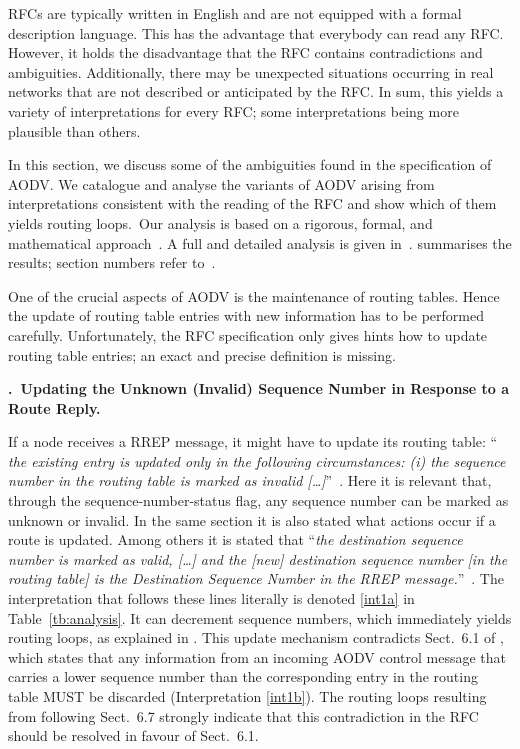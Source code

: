 \documentclass[letterpaper]{sig-alternate-pages}
\newcommand{\rtes}{routing table entries\xspace}
\renewcommand{\sf}{\it}
\begin{document}
\hspace{-1.28546pt}RFCs are typically written in English and are not equipped with a formal description language. 
This has the advantage that everybody can read any RFC\@. 
However, it holds the disadvantage that the RFC contains contradictions and ambiguities. 
Additionally, there may be unexpected situations occurring in real
networks that are not described or anticipated by the RFC\@. 
In sum, this yields a variety of interpretations for every RFC\@; some interpretations being more plausible than others.

In this section, we discuss some of the ambiguities found in the specification of AODV.
We catalogue and analyse the variants of AODV
arising from interpretations consistent with the reading of the RFC and show which of them yields routing loops.\
Our analysis is based on a rigorous, formal, and mathematical approach~\cite{ESOP12}.
A full and detailed analysis is given in~\cite{TR11}.
 summarises the results; section numbers refer to~\cite{rfc3561}.

One of the crucial aspects of AODV is the maintenance of routing tables.
Hence the update of \rtes with new information has to be performed carefully. 
Unfortunately, the RFC specification only gives hints 
how to update \rtes; an exact and precise definition is missing.

\setcounter{myp}{1}
\newcommand{\myparagraph}[1]{{\vspace{0pt plus 4pt}\par\hspace{-3pt}\textbf{.~#1.}\addtocounter{myp}{1}}}


\myparagraph{Updating the Unknown (Invalid) Sequence Number in Response to a Route Reply}
If a node {receives a RREP message, it might have to update its routing table}:
``{\sf
  the existing entry is updated only in the following circumstances:
  (i) the sequence number in the routing table is marked as invalid {[\dots]}\/}''~\cite[Sect.~6.7]{rfc3561}.
Here it is relevant that, through the sequence-number-status flag, any
  sequence number can be marked as unknown or invalid.
 In the same section it is also stated what actions occur if a route is updated. Among others it is stated that 
 ``{\sf the destination sequence number is marked as valid, [\dots] and the [new] destination sequence number [in the routing table] is the Destination Sequence 
      Number in the RREP message.\/}''~\cite[Sect.\ 6.7]{rfc3561}.
 The interpretation that follows these lines literally is denoted \ref{int1a} in Table~\ref{tb:analysis}. It
can decrement sequence numbers,
which immediately yields routing loops, as explained in \cite[Sect.~8]{TR11}.
This update mechanism contradicts Sect.\ 6.1 of \cite{rfc3561},
  which states that any information from an incoming AODV control
  message that carries a lower sequence number than the corresponding
  entry in the routing table MUST be discarded (Interpretation \ref{int1b}).
  The routing loops resulting from following Sect.\ 6.7 strongly
  indicate that this contradiction in the RFC should be resolved in
  favour of Sect.\ 6.1.
\end{document}
